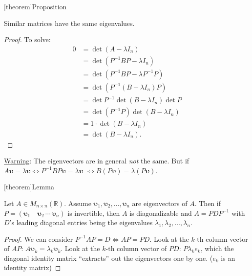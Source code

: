 \documentclass[12pt]{report}
\theoremstyle{definition}
\begin{document}
[theorem]{Proposition}
\begin{similar matrices have the same eigenvalues}
    Similar matrices have the same eigenvalues.
\end{similar matrices have the same eigenvalues}

\begin{proof}
    To solve: \[
        \begin{align*}
            0 & = \det{(A-\lambda I_n)} \\
              & = \det{(P^{-1}BP - \lambda I_n)} \\
              & = \det{(P^{-1}BP - \lambda P^{-1}P)} \\
              & = \det{(P^{-1}(B-\lambda I_n)P)} \\
              & = \det{P^{-1}} \det{(B-\lambda I_n)} \det{P} \\
              & = \det{(P^{-1}P)}\det{(B-\lambda I_n)} \\
              & = 1 \cdot \det{(B-\lambda I_n)} \\
              & = \det{(B-\lambda I_n)}.
        \end{align*}
    \]
\end{proof}

\underline{Warning}: The eigenvectors are in general \emph{not} the same.
But if $A\pmb{\upsilon} = \lambda \pmb{\upsilon} \iff P^{-1}BP\pmb{\upsilon} = \lambda\pmb{\upsilon}$
$\iff B(P\pmb{\upsilon}) = \lambda (P\pmb{\upsilon})$.

[theorem]{Lemma}
\begin{eigenvalues of D}
    Let $A \in M_{n\times n}(\mathbb{R})$. Assume $\pmb{\upsilon}_1, \pmb{\upsilon}_2,\ldots,\pmb{\upsilon}_n$
    are eigenvectors of $A$. Then if $P = (\pmb{\upsilon}_1 \quad \pmb{\upsilon}_2 \,\cdots\, \pmb{\upsilon}_n)$
    is invertible, then $A$ is diagonalizable and $A = PDP^{-1}$ with $D$'s leading
    diagonal entries being the eigenvalues $\lambda_1, \lambda_2, \ldots, \lambda_n$.
\end{eigenvalues of D}

\begin{proof}
    We can consider $P^{-1}AP = D \iff AP = PD$.
    Look at the $k$-th column vector of $AP$: $A\pmb{\upsilon}_k = \lambda_k \pmb{\upsilon}_k$.
    Look at the $k$-th column vector of $PD$: $P\lambda_k e_k$, which 
    the diagonal identity matrix ``extracts'' out the eigenvectors one by one.
    ($e_k$ is an identity matrix)
\end{proof}
\end{document}
